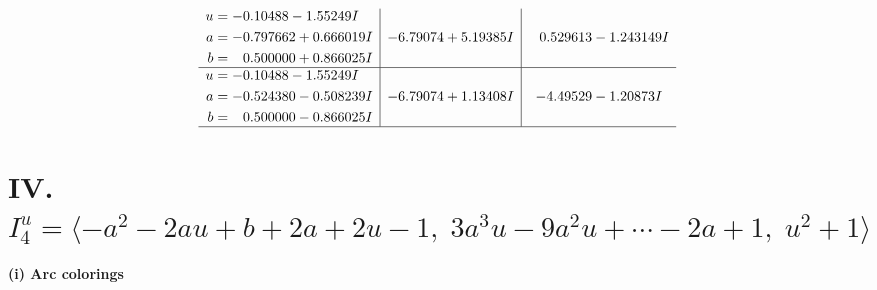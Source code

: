\documentclass[1p]{elsarticle_modified}
\theoremstyle{definition}
\begin{document}
$$\begin{array}{c|c|c}
\begin{aligned}
u &= -0.10488 - 1.55249 I \\
a &= -0.797662 + 0.666019 I \\
b &= \phantom{-}0.500000 + 0.866025 I\end{aligned}
 & -6.79074 + 5.19385 I & \phantom{-}0.529613 - 1.243149 I \\ \hline\begin{aligned}
u &= -0.10488 - 1.55249 I \\
a &= -0.524380 - 0.508239 I \\
b &= \phantom{-}0.500000 - 0.866025 I\end{aligned}
 & -6.79074 + 1.13408 I & -4.49529 - 1.20873 I\\
 \hline 
 \end{array}$$\newpage\newpage\renewcommand{\arraystretch}{1}
\centering \section*{IV. $I^u_{4}= \langle - a^2-2 a u+b+2 a+2 u-1,\;3 a^3 u-9 a^2 u+\cdots-2 a+1,\;u^2+1 \rangle$}
\flushleft \textbf{(i) Arc colorings}\\
\end{document}
